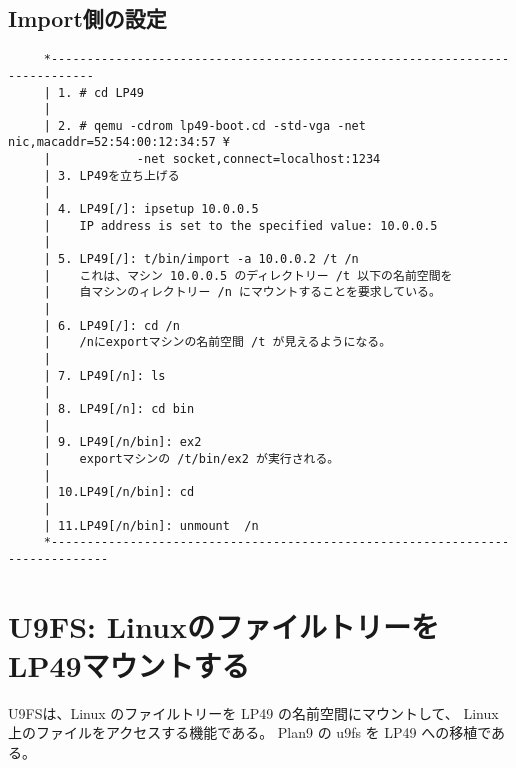 \section{Import側の設定}

\begin{verbatim}        
     *----------------------------------------------------------------------------
     | 1. # cd LP49                                                                      
     |
     | 2. # qemu -cdrom lp49-boot.cd -std-vga -net nic,macaddr=52:54:00:12:34:57 ¥       
     |            -net socket,connect=localhost:1234                                     
     | 3. LP49を立ち上げる      
     |
     | 4. LP49[/]: ipsetup 10.0.0.5                                                      
     |    IP address is set to the specified value: 10.0.0.5                             
     |
     | 5. LP49[/]: t/bin/import -a 10.0.0.2 /t /n                                        
     |    これは、マシン 10.0.0.5 のディレクトリー /t 以下の名前空間を
     |    自マシンのィレクトリー /n にマウントすることを要求している。
     |     
     | 6. LP49[/]: cd /n                                                                
     |    /nにexportマシンの名前空間 /t が見えるようになる。                            
     |
     | 7. LP49[/n]: ls                                                                  
     |
     | 8. LP49[/n]: cd bin                                                              
     |
     | 9. LP49[/n/bin]: ex2                                                             
     |    exportマシンの /t/bin/ex2 が実行される。                                      
     |
     | 10.LP49[/n/bin]: cd                                                              
     |
     | 11.LP49[/n/bin]: unmount  /n                                                     
     *------------------------------------------------------------------------------
\end{verbatim}   
    

\chapter{U9FS: LinuxのファイルトリーをLP49マウントする}

      U9FSは、Linux のファイルトリーを LP49 の名前空間にマウントして、
      Linux上のファイルをアクセスする機能である。
      Plan9 の u9fs を LP49 への移植である。
    

